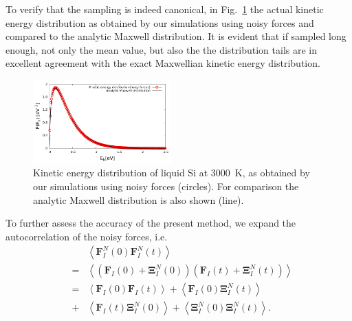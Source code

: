 To verify that the sampling is indeed canonical, in Fig.~\ref{Fig3} the actual kinetic energy distribution as obtained by our simulations using noisy forces and compared to the analytic Maxwell distribution. It is evident that if sampled long enough, not only the mean value, but also the the distribution tails are in excellent agreement with the exact Maxwellian kinetic energy distribution.
\begin{figure}%
\begin{center} 
\includegraphics[width=0.475\textwidth]
{figures/maxwelldistribution_new.pdf}
\end{center}
\caption{\label{Fig3}
Kinetic energy distribution of liquid Si at 3000~K, as obtained by our simulations using noisy forces (circles). For comparison the analytic Maxwell distribution is also shown (line).
} \end{figure}
To further assess the accuracy of the present method, we expand the autocorrelation of the noisy forces, i.e. 
\begin{subequations}
\begin{eqnarray}
  && \left \langle \textbf{F}_{I}^{N}\left ( 0 \right )\textbf{F}_{I}^{N}\left ( t \right )\right \rangle \\
  &=& \left \langle \left ( \textbf{F}_{I}\left ( 0 \right ) + \mathbf{\Xi } _{I}^{N} \left(0 \right )\right) \left( \textbf{F}_{I}\left ( t \right )+\mathbf{\Xi } _{I}^{N}\left ( t \right )\right) \right \rangle \\
  &=& \left \langle \textbf{F}_{I}\left ( 0 \right ) \textbf{F}_{I}\left ( t \right )\right \rangle + \left \langle \textbf{F}_{I}\left ( 0 \right ) \mathbf{\Xi } _{I}^{N}\left(t \right )\right \rangle \label{AutoCorr} \\ 
  &+& \left \langle \textbf{F}_{I}\left ( t \right ) \mathbf{\Xi } _{I}^{N}\left(0 \right )\right \rangle + \left \langle \mathbf{\Xi } _{I}^{N}\left(0 \right ) \mathbf{\Xi } _{I}^{N}\left(t \right )\right \rangle.  \nonumber
\end{eqnarray}
\end{subequations}
